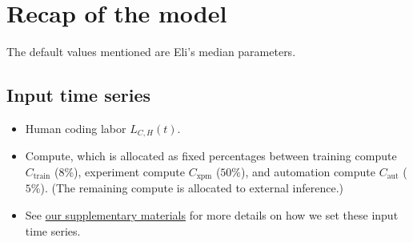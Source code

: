 \documentclass{article}
\theoremstyle{definition}
\begin{document}

\section{Recap of the model}

The default values mentioned are Eli's median parameters.

\subsection{Input time series}
\begin{itemize}
\item Human coding labor $L_{C,H}(t)$.
\item Compute, which is allocated as fixed percentages between training compute $C_\text{train}$ ($8\%$), experiment compute $C_\text{xpm}$ ($50\%$), and automation compute $C_\text{aut}$ ($5\%$). (The remaining compute is allocated to external inference.)
\item See \href{https://docs.google.com/document/d/1ru6Okbxb6XuH18Cz8439sdQJazMV39hNxsWDokh97r0/edit?tab=t.0#heading=h.6ml0ol8kxh0w}{our supplementary materials} for more details on how we set these input time series.
\end{itemize}
\end{document}
